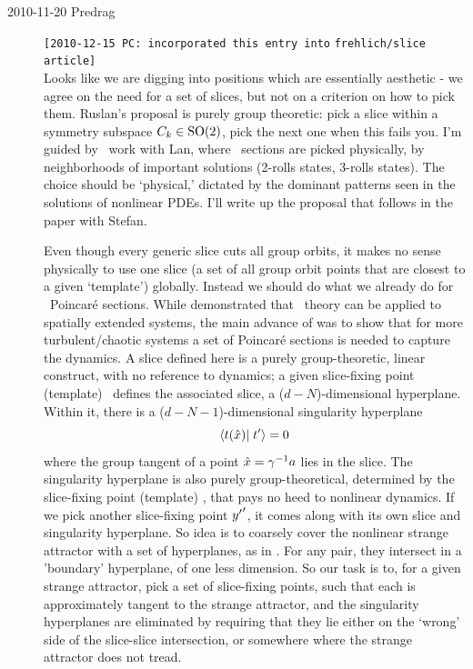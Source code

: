 \begin{description}
\item[2010-11-20 Predrag]
\texttt{[2010-12-15 PC: incorporated this entry into}
 \texttt{frehlich/slice article]}
\\
Looks like we are digging into positions which are essentially aesthetic
- we agree on the need for a set of slices, but not on a criterion on
how to pick them. Ruslan's proposal is purely group theoretic: pick a slice
within a symmetry subspace $C_k \in \textrm{SO}(2)$, pick the next one when this
fails you. I'm guided by \KS\ work with Lan, where \Poincare\ sections
are picked physically,
by neighborhoods of important solutions (2-rolls states, 3-rolls
states). The choice should be `physical,'
dictated by the dominant patterns seen in the solutions of
nonlinear PDEs.
I'll write up the proposal that follows
in the paper with Stefan.

Even though every generic
slice cuts all group orbits, it makes no sense physically to
use one slice
(a set of all group orbit points that are closest to a given `template')
globally. Instead we should do what we
already do for \KS\ Poincar\'e sections. While  demonstrated
that \po\ theory can be applied to spatially extended systems, the
main advance of
 was to show that for more turbulent/chaotic systems a set
of Poincar\'e sections is needed to capture the dynamics.
A slice defined here is a purely group-theoretic, linear construct, with no reference
to dynamics; a given slice-fixing point (template) \slicep\ defines
the associated slice, a ($d\!-\!N$)-dimensional hyperplane.
Within it, there is a ($d\!-\!N\!-1$)-dimensional
singularity hyperplane
\[
\braket{\groupTan(\sspRed)}{\sliceTan{}}=0
\]
where the group tangent of a point
$\hat{x}=\gamma^{-1} a$ lies in the slice. The singularity hyperplane
is also purely group-theoretical,
determined by the slice-fixing point (template) \slicep,
that pays no heed to nonlinear dynamics. If we pick another
slice-fixing point ${y'}'$, it comes along with its own slice
and singularity hyperplane. So idea is to coarsely cover the nonlinear
strange attractor with a set of hyperplanes, as in .
For any pair, they intersect in a 'boundary' hyperplane, of one less dimension.
So our task is to, for a given strange attractor, pick a set of slice-fixing
points, such that each is approximately tangent to the strange attractor,
and the singularity hyperplanes are eliminated by requiring that they
lie either on the `wrong' side of the slice-slice intersection, or somewhere where
the strange attractor does not tread.


\end{description}
